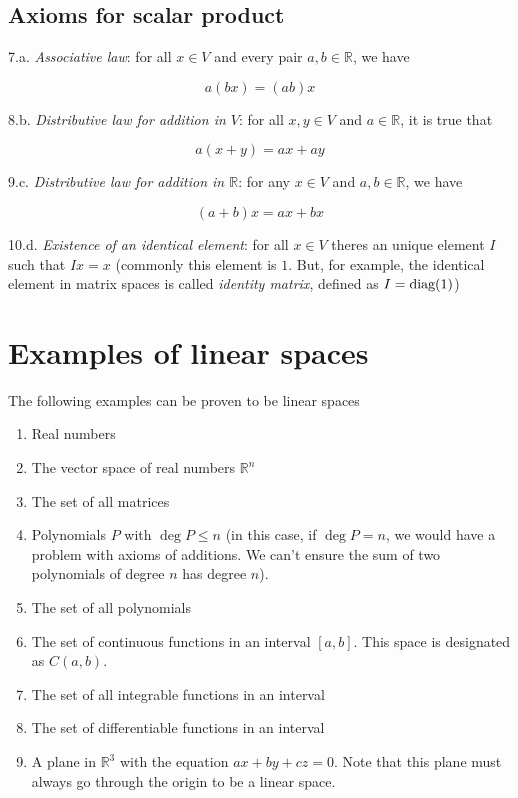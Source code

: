 \documentclass{report}
\begin{document}
\subsection*{Axioms for scalar product}
\begin{list}{Axiom}{}

    \item 7.a.\textit{ Associative law}: for all $x \in V$ and every pair $a,b\in \mathbb R$, we have

          \[
              a(bx) = (ab)x
          \]

    \item 8.b.\textit{ Distributive law for addition in $V$}: for all $x,y\in V$ and $a\in \mathbb{R}$, it is true that

          \[
              a(x+y) = ax+ay
          \]

    \item 9.c.\textit{ Distributive law for addition in $\mathbb R$}: for any $x\in V$ and $a,b\in\mathbb{R}$, we have

          \[
              (a+b)x = ax+bx
          \]

    \item 10.d.\textit{ Existence of an identical element}: for all $x\in V$ theres an unique element $I$ such that $Ix=x$
          (commonly this element is $1$. But, for example, the identical element in matrix spaces is called \textit{identity matrix},
          defined as $I=\textnormal{diag}(1)$)
\end{list}

\section{Examples of linear spaces}

The following examples can be proven to be linear spaces

\begin{enumerate}
    \item Real numbers
    \item The vector space of real numbers $\mathbb R^n$
    \item The set of all matrices
    \item Polynomials $P$ with $\deg P \leq n$ (in this case, if $\deg P = n$, we would
          have a problem with axioms of additions. We can't ensure the sum of two
          polynomials of degree $n$ has degree $n$).
    \item The set of all polynomials
    \item The set of continuous functions in an interval $\left[a, b\right]$. This space
          is designated as $C(a,b)$.
    \item The set of all integrable functions in an interval
    \item The set of differentiable functions in an interval
    \item A plane in $\mathbb R^3$ with the equation $ax+by+cz=0$. Note that this plane
          must always go through the origin to be a linear space.
\end{enumerate}
\end{document}
